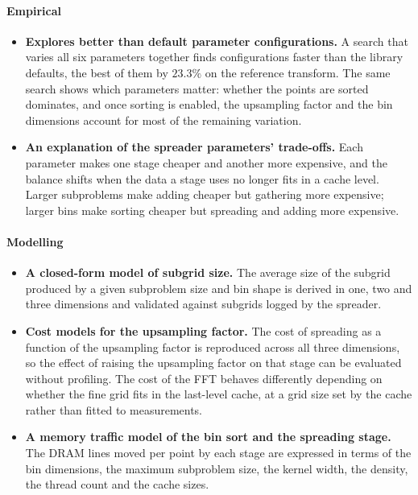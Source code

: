 \paragraph{Empirical}
\begin{itemize}
    \item \textbf{Explores better than default parameter configurations.} A
    search that varies all six parameters together finds configurations faster
    than the library defaults, the best of them by $23.3\%$ on the reference
    transform. The same search shows which parameters matter: whether the points
    are sorted dominates, and once sorting is enabled, the upsampling factor and
    the bin dimensions account for most of the remaining variation.

    \item \textbf{An explanation of the spreader parameters' trade-offs.} Each
    parameter makes one stage cheaper and another more expensive, and the
    balance shifts when the data a stage uses no longer fits in a cache level.
    Larger subproblems make adding cheaper but gathering more expensive; larger
    bins make sorting cheaper but spreading and adding more expensive.
\end{itemize}

\paragraph{Modelling}
\begin{itemize}
    \item \textbf{A closed-form model of subgrid size.} The average size of the
    subgrid produced by a given subproblem size and bin shape is derived in one,
    two and three dimensions and validated against
    subgrids logged by the spreader.

    \item \textbf{Cost models for the upsampling factor.} The cost of spreading
    as a function of the upsampling factor is reproduced across all three
    dimensions, so the effect of raising the upsampling factor on that stage can be evaluated without profiling.
    The cost of the FFT behaves differently depending on whether the fine grid
    fits in the last-level cache, at a grid size set by the cache rather than
    fitted to measurements.

    \item \textbf{A memory traffic model of the bin sort and the spreading
    stage.} The DRAM lines moved per point by each stage are expressed in terms
    of the bin dimensions, the maximum subproblem size, the kernel width, the
    density, the thread count and the cache sizes.
\end{itemize}

